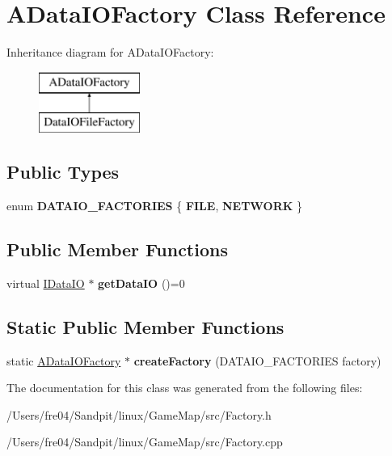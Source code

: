 \hypertarget{class_a_data_i_o_factory}{}\section{A\+Data\+I\+O\+Factory Class Reference}
\label{class_a_data_i_o_factory}
Inheritance diagram for A\+Data\+I\+O\+Factory\+:\begin{figure}[H]
\begin{center}
\leavevmode
\includegraphics[height=2.000000cm]{class_a_data_i_o_factory}
\end{center}
\end{figure}
\subsection*{Public Types}
\begin{DoxyCompactItemize}
\item 
\hypertarget{class_a_data_i_o_factory_a8d3b624716b321944b9d2b9bc8ef9db8}{}enum {\bfseries D\+A\+T\+A\+I\+O\+\_\+\+F\+A\+C\+T\+O\+R\+I\+E\+S} \{ {\bfseries F\+I\+L\+E}, 
{\bfseries N\+E\+T\+W\+O\+R\+K}
 \}\label{class_a_data_i_o_factory_a8d3b624716b321944b9d2b9bc8ef9db8}

\end{DoxyCompactItemize}
\subsection*{Public Member Functions}
\begin{DoxyCompactItemize}
\item 
\hypertarget{class_a_data_i_o_factory_a9c1c8eecd7bf30752d6f7a44aaf6ffd2}{}virtual \hyperlink{class_i_data_i_o}{I\+Data\+I\+O} $\ast$ {\bfseries get\+Data\+I\+O} ()=0\label{class_a_data_i_o_factory_a9c1c8eecd7bf30752d6f7a44aaf6ffd2}

\end{DoxyCompactItemize}
\subsection*{Static Public Member Functions}
\begin{DoxyCompactItemize}
\item 
\hypertarget{class_a_data_i_o_factory_ae54161981aea56ddd6b69ba15cfa7bcb}{}static \hyperlink{class_a_data_i_o_factory}{A\+Data\+I\+O\+Factory} $\ast$ {\bfseries create\+Factory} (D\+A\+T\+A\+I\+O\+\_\+\+F\+A\+C\+T\+O\+R\+I\+E\+S factory)\label{class_a_data_i_o_factory_ae54161981aea56ddd6b69ba15cfa7bcb}

\end{DoxyCompactItemize}


The documentation for this class was generated from the following files\+:\begin{DoxyCompactItemize}
\item 
/\+Users/fre04/\+Sandpit/linux/\+Game\+Map/src/Factory.\+h\item 
/\+Users/fre04/\+Sandpit/linux/\+Game\+Map/src/Factory.\+cpp\end{DoxyCompactItemize}
